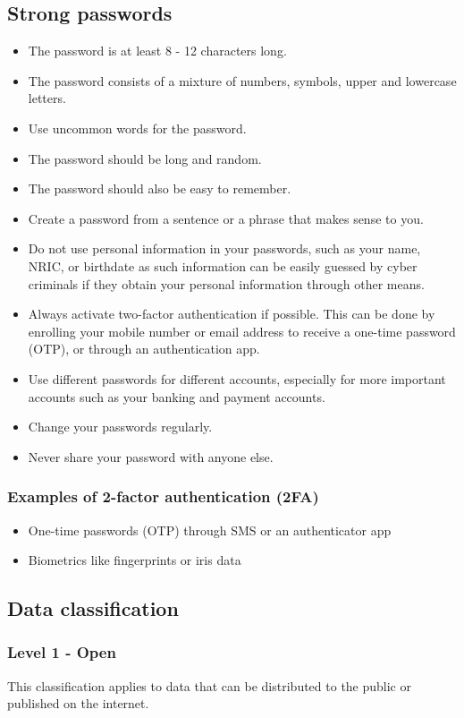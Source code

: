 \documentclass[11pt]{article}
\begin{document}
\subsection{Strong passwords}
\label{sec:orgb3e61bc}
\begin{itemize}
\item The password is at least 8 - 12 characters long.
\item The password consists of a mixture of numbers, symbols, upper and lowercase letters.
\item Use uncommon words for the password.
\item The password should be long and random.
\item The password should also be easy to remember.
\item Create a password from a sentence or a phrase that makes sense to you.
\item Do not use personal information in your passwords, such as your name, NRIC, or birthdate as such information can be easily guessed by cyber criminals if they obtain your personal information through other means.
\item Always activate two-factor authentication if possible. This can be done by enrolling your mobile number or email address to receive a one-time password (OTP), or through an authentication app.
\item Use different passwords for different accounts, especially for more important accounts such as your banking and payment accounts.
\item Change your passwords regularly.
\item Never share your password with anyone else.
\end{itemize}
\subsubsection{Examples of 2-factor authentication (2FA)}
\label{sec:orge28b5be}
\begin{itemize}
\item One-time passwords (OTP) through SMS or an authenticator app
\item Biometrics like fingerprints or iris data
\end{itemize}
\subsection{Data classification}
\label{sec:org42b0442}

\subsubsection{Level 1 - Open}
\label{sec:org8686247}
This classification applies to data that can be distributed to the public or published on the internet.
\end{document}
